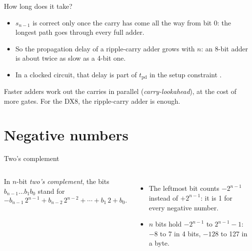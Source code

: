 \documentclass[10pt]{wosm-slides}
\begin{document}
\begin{frame}{How long does it take?}
  \begin{itemize}
    \item $s_{n-1}$ is correct only once the carry has come all the way from bit 0:
      the longest path goes through every full adder.
    \item So the propagation delay  of a ripple-carry adder grows with $n$:
      an 8-bit adder is about twice as slow as a 4-bit one.
    \item In a clocked circuit, that delay is part of $t_{\mathrm{pd}}$ in the setup
      constraint .
  \end{itemize}

  \begin{remark}
    Faster adders work out the carries in parallel (\emph{carry-lookahead}), at the
    cost of more gates. For the DX8, the ripple-carry adder is enough.
  \end{remark}
\end{frame}

\section{Negative numbers}

\begin{frame}{Two's complement}
  \begin{columns}[c, totalwidth=\textwidth]
      \begin{definition}
        In $n$-bit \emph{two's complement}, the bits $b_{n-1} \ldots b_1 b_0$ stand
        for
        \[ -b_{n-1}\, 2^{n-1} + b_{n-2}\, 2^{n-2} + \cdots + b_1\, 2 + b_0. \]
      \end{definition}
      \begin{itemize}
        \item The leftmost bit counts $-2^{n-1}$ instead of $+2^{n-1}$: it is 1 for
          every negative number.
        \item $n$ bits hold $-2^{n-1}$ to $2^{n-1} - 1$: $-8$ to 7 in 4 bits,
          $-128$ to 127 in a byte.
      \end{itemize}
      \centering
      \par\smallskip
  \end{columns}
\end{frame}
\end{document}

